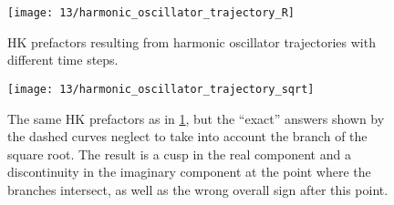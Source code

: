 \begin{figure}
	\centering
	\texttt{[image: 13/harmonic\_oscillator\_trajectory\_R]}
	\caption[
		Example HK prefactors for harmonic oscillator
	]{
		HK prefactors resulting from harmonic oscillator trajectories with different time steps.
		\explainplotsas{}
	}
	\label{fig:harmonic-oscillator-trajectory-b}
\end{figure}

\begin{figure}
	\centering
	\texttt{[image: 13/harmonic\_oscillator\_trajectory\_sqrt]}
	\caption[
		HK prefactors with incorrect square root branch
	]{
		The same HK prefactors as in \cref{fig:harmonic-oscillator-trajectory-b}, but the ``exact'' answers shown by the dashed curves neglect to take into account the branch of the square root.
		The result is a cusp in the real component and a discontinuity in the imaginary component at the point where the branches intersect, as well as the wrong overall sign after this point.
	}
	\label{fig:harmonic-oscillator-trajectory-sqrt}
\end{figure}

